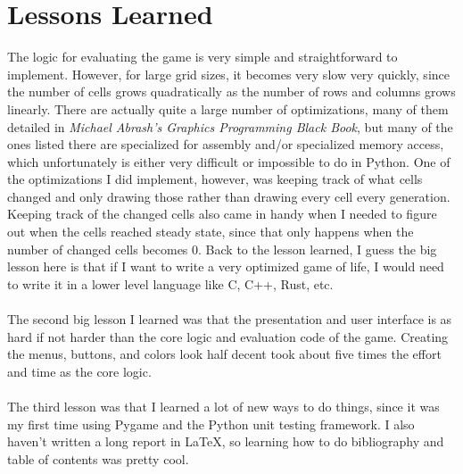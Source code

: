 \documentclass[12pt]{report}
\begin{document}
\chapter{Lessons Learned}
The logic for evaluating the game is very simple and straightforward to implement. 
However, for large grid sizes, it becomes very slow very quickly, since the number of cells grows quadratically as the number of rows and columns grows linearly.
There are actually quite a large number of optimizations, many of them detailed in \emph{Michael Abrash's Graphics Programming Black Book}, but many of the ones listed there 
are specialized for assembly and/or specialized memory access, which unfortunately is either very difficult or impossible to do in Python.\cite{abrash:1997} One of the optimizations I did implement, however,
was keeping track of what cells changed and only drawing those rather than drawing every cell every generation. Keeping track of the changed cells also came in handy when I needed to figure out
when the cells reached steady state, since that only happens when the number of changed cells becomes 0. Back to the lesson learned, 
I guess the big lesson here is that if I want to write a very optimized game of life, I would need to write it in a lower level language like C, C++, Rust, etc.\\\\
The second big lesson I learned was that the presentation and user interface is as hard if not harder than the core logic and evaluation code of the game.
Creating the menus, buttons, and colors look half decent took about five times the effort and time as the core logic.\\\\
The third lesson was that I learned a lot of new ways to do things, since it was my first time using Pygame and the Python unit testing framework. 
I also haven't written a long report in \LaTeX, so learning how to do bibliography and table of contents was pretty cool.



 
\end{document}
